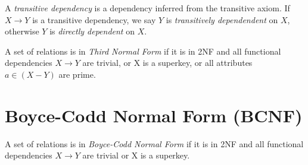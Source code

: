 \begin{definition}

A \emph{transitive dependency} is a dependency inferred from the
transitive axiom.  If $X \rightarrow Y$ is a transitive dependency, we
say $Y$ is \emph{transitively dependendent} on $X$, otherwise $Y$ is
\emph{directly dependent} on $X$.

\end{definition}

\begin{definition}

A set of relations is in \emph{Third Normal Form} if it is in 2NF and
all functional dependencies $X \rightarrow Y$ are trivial, or X is a
superkey, or all attributes $a \in (X - Y)$ are prime.

\end{definition}

\section{Boyce-Codd Normal Form (BCNF)}

\begin{definition}

A set of relations is in \emph{Boyce-Codd Normal Form} if it is in 2NF
and all functional dependencies $X \rightarrow Y$ are trivial or X is
a superkey.

\end{definition}
